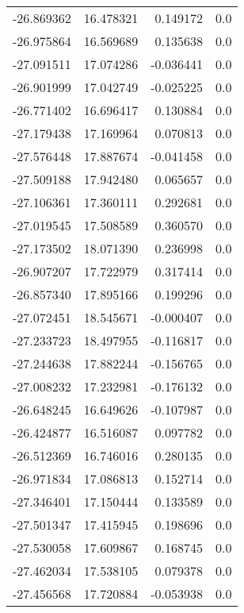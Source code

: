 \begin{tabular}{rrrr}
      -26.869362 &        16.478321 &    0.149172 &   0.0 \\
      -26.975864 &        16.569689 &    0.135638 &   0.0 \\
      -27.091511 &        17.074286 &   -0.036441 &   0.0 \\
      -26.901999 &        17.042749 &   -0.025225 &   0.0 \\
      -26.771402 &        16.696417 &    0.130884 &   0.0 \\
      -27.179438 &        17.169964 &    0.070813 &   0.0 \\
      -27.576448 &        17.887674 &   -0.041458 &   0.0 \\
      -27.509188 &        17.942480 &    0.065657 &   0.0 \\
      -27.106361 &        17.360111 &    0.292681 &   0.0 \\
      -27.019545 &        17.508589 &    0.360570 &   0.0 \\
      -27.173502 &        18.071390 &    0.236998 &   0.0 \\
      -26.907207 &        17.722979 &    0.317414 &   0.0 \\
      -26.857340 &        17.895166 &    0.199296 &   0.0 \\
      -27.072451 &        18.545671 &   -0.000407 &   0.0 \\
      -27.233723 &        18.497955 &   -0.116817 &   0.0 \\
      -27.244638 &        17.882244 &   -0.156765 &   0.0 \\
      -27.008232 &        17.232981 &   -0.176132 &   0.0 \\
      -26.648245 &        16.649626 &   -0.107987 &   0.0 \\
      -26.424877 &        16.516087 &    0.097782 &   0.0 \\
      -26.512369 &        16.746016 &    0.280135 &   0.0 \\
      -26.971834 &        17.086813 &    0.152714 &   0.0 \\
      -27.346401 &        17.150444 &    0.133589 &   0.0 \\
      -27.501347 &        17.415945 &    0.198696 &   0.0 \\
      -27.530058 &        17.609867 &    0.168745 &   0.0 \\
      -27.462034 &        17.538105 &    0.079378 &   0.0 \\
      -27.456568 &        17.720884 &   -0.053938 &   0.0 \\

\end{tabular}
